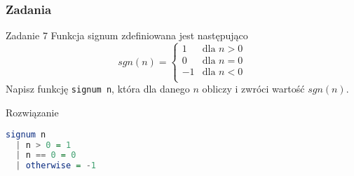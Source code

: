 \begin{frame}[fragile]
  \frametitle{Zadania}
  \begin{block}{Zadanie 7}
    Funkcja signum zdefiniowana jest następująco
    \begin{equation*}
      sgn(n) =
	\left\{\begin{array}{ll}
	  1 &\text{dla $n > 0$}\\
	  0 &\text{dla $n = 0$}\\
	  -1 &\text{dla $n < 0$}\\
	\end{array} \right.
    \end{equation*}
    Napisz funkcję \texttt{signum n}, która dla danego $n$ obliczy i zwróci
    wartość $sgn(n)$.
  \end{block}
  \vspace{1em}
  \pause

  \begin{block}{Rozwiązanie}
    \begin{lstlisting}[language=Haskell]
signum n
  | n > 0 = 1
  | n == 0 = 0
  | otherwise = -1
    \end{lstlisting}
  \end{block}
\end{frame}

